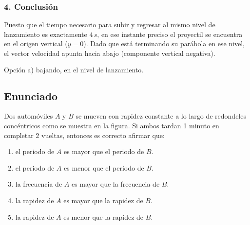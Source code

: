 \documentclass[12pt, a4paper]{article}
\begin{document}
\subsubsection*{4. Conclusión}
Puesto que el tiempo necesario para subir y regresar al mismo nivel de lanzamiento es exactamente $4 \, \si{s}$, en ese instante preciso el proyectil se encuentra en el origen vertical ($y=0$). Dado que está terminando su parábola en ese nivel, el vector velocidad apunta hacia abajo (componente vertical negativa). 

\begin{tcolorbox}[colback=green!5!white, colframe=green!50!black, title=Respuesta Final]
\centering Opción a) bajando, en el nivel de lanzamiento.
\end{tcolorbox}

\newpage

\subsection*{Enunciado}
Dos automóviles $A$ y $B$ se mueven con rapidez constante a lo largo de redondeles concéntricos como se muestra en la figura. Si ambos tardan 1 minuto en completar 2 vueltas, entonces es correcto afirmar que:
\begin{enumerate}[label=\alph*)]
    \item el periodo de $A$ es mayor que el periodo de $B$.
    \item el periodo de $A$ es menor que el periodo de $B$.
    \item la frecuencia de $A$ es mayor que la frecuencia de $B$.
    \item la rapidez de $A$ es mayor que la rapidez de $B$.
    \item la rapidez de $A$ es menor que la rapidez de $B$.
\end{enumerate}

\begin{center}
\end{center}
\end{document}
